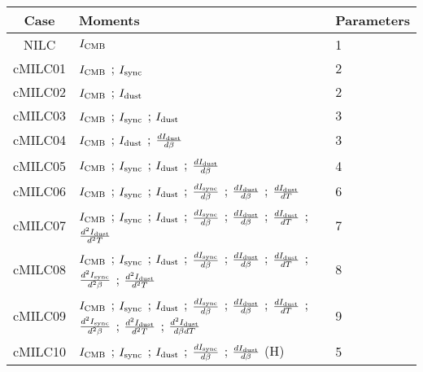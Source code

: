 \begin{tabular}{cll}
\toprule
    Case &                                                                                                                                                                                                                                                                  Moments &  Parameters \\
\midrule
 NILC &  $I_{\rm CMB}$ &  1 \\
 cMILC01 &  $I_{\rm CMB}$ ; $I_{\rm sync}$ &  2 \\
 cMILC02 &  $I_{\rm CMB}$ ; $I_{\rm dust}$ &  2 \\
 cMILC03 &  $I_{\rm CMB}$ ; $I_{\rm sync}$ ; $I_{\rm dust}$ &  3 \\
 cMILC04 &  $I_{\rm CMB}$ ; $I_{\rm dust}$ ; $\frac{d I_{\rm dust}}{d \beta}$ &  3 \\
 cMILC05 &  $I_{\rm CMB}$ ; $I_{\rm sync}$ ; $I_{\rm dust}$ ; $\frac{d I_{\rm dust}}{d \beta}$ &  4 \\
 cMILC06 &  $I_{\rm CMB}$ ; $I_{\rm sync}$ ; $I_{\rm dust}$ ; $\frac{d I_{\rm sync}}{d \beta}$ ; $\frac{d I_{\rm dust}}{d \beta}$ ; $\frac{d I_{\rm dust}}{d T}$ &  6 \\
 cMILC07 &  $I_{\rm CMB}$ ; $I_{\rm sync}$ ; $I_{\rm dust}$ ; $\frac{d I_{\rm sync}}{d \beta}$ ; $\frac{d I_{\rm dust}}{d \beta}$ ; $\frac{d I_{\rm dust}}{d T}$ ; $\frac{d^2 I_{\rm dust}}{d^2 T}$ &  7 \\
 cMILC08 &  $I_{\rm CMB}$ ; $I_{\rm sync}$ ; $I_{\rm dust}$ ; $\frac{d I_{\rm sync}}{d \beta}$ ; $\frac{d I_{\rm dust}}{d \beta}$ ; $\frac{d I_{\rm dust}}{d T}$ ; $\frac{d^2 I_{\rm sync}}{d^2 \beta}$ ; $\frac{d^2 I_{\rm dust}}{d^2 T}$ &  8 \\
 cMILC09 &  $I_{\rm CMB}$ ; $I_{\rm sync}$ ; $I_{\rm dust}$ ; $\frac{d I_{\rm sync}}{d \beta}$ ; $\frac{d I_{\rm dust}}{d \beta}$ ; $\frac{d I_{\rm dust}}{d T}$ ; $\frac{d^2 I_{\rm sync}}{d^2 \beta}$ ; $\frac{d^2 I_{\rm dust}}{d^2 T}$ ; $\frac{d^2 I_{\rm dust}}{d \beta d T}$ &  9 \\
 cMILC10 &  $I_{\rm CMB}$ ; $I_{\rm sync}$ ; $I_{\rm dust}$ ; $\frac{d I_{\rm sync}}{d \beta}$ ; $\frac{d I_{\rm dust}}{d \beta}$ (H) &  5 \\
\bottomrule
\end{tabular}
